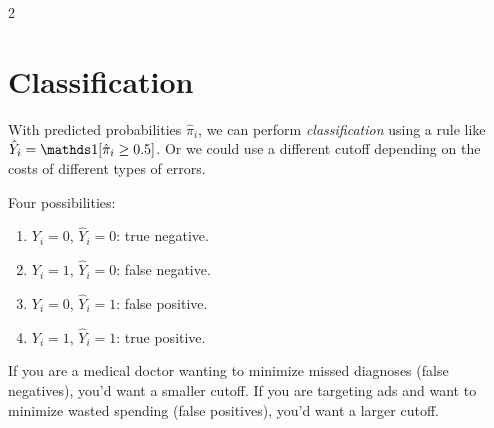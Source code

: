 \documentclass[12pt]{article}
\begin{document}
\begin{multicols}{2}
  \section*{Classification}

  With predicted probabilities $\hat{\pi}_i$, we can perform \emph{classification} using a rule like $\hat{Y}_i = \one{\hat{\pi}_i \geq 0.5}$. Or we could use a different cutoff depending on the costs of different types of errors.

  Four possibilities:
  \begin{enumerate}
    \item $Y_i = 0$, $\hat{Y}_i = 0$: true negative.
    \item $Y_i = 1$, $\hat{Y}_i = 0$: false negative.
    \item $Y_i = 0$, $\hat{Y}_i = 1$: false positive.
    \item $Y_i = 1$, $\hat{Y}_i = 1$: true positive.
  \end{enumerate}

  If you are a medical doctor wanting to minimize missed diagnoses (false negatives), you'd want a smaller cutoff. If you are targeting ads and want to minimize wasted spending (false positives), you'd want a larger cutoff.

\end{multicols}
\end{document}

